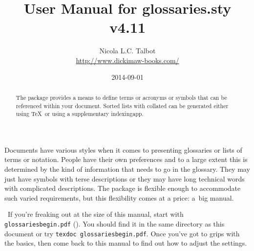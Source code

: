 \documentclass[report,inlinetitle]{nlctdoc}
\begin{document}
\DeleteShortVerb{\|}

 \title{User Manual for glossaries.sty v4.11}
 \author{Nicola L.C. Talbot\\%
  \url{http://www.dickimaw-books.com/}}

 \date{2014-09-01}
 \maketitle

\begin{abstract}
The  package provides a means to define terms or
acronyms or symbols that can be referenced within your document.
Sorted lists with collated  can be 
generated either using \TeX\ or using a supplementary \gls{indexingapp}.
\end{abstract}

\begin{important}
Documents have various styles when it comes to presenting glossaries
or lists of terms or notation. People have their own preferences and
to a large extent this is determined by the kind of information that
needs to go in the glossary. They may just have symbols with
terse descriptions or they may have long technical words with
complicated descriptions. The  package is
flexible enough to accommodate such varied requirements, but this
flexibility comes at a price: a~big manual.

\aargh\ If you're freaking out at the size of this manual, start with
\texttt{glossariesbegin.pdf} (). You should find it in the same directory as this
document or try \texttt{texdoc glossariesbegin.pdf}. Once you've got
to grips with the basics, then come back to this manual to find out
how to adjust the settings.
\end{important}
\end{document}
